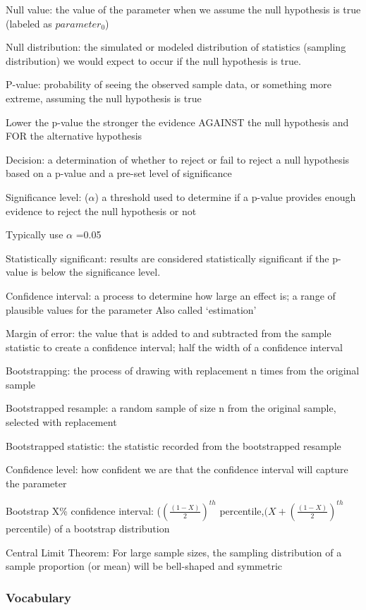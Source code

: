 \documentclass[
]{report}
\newcommand{\rgi}{\hspace{24pt}}  %
\begin{document}
Null value: the value of the parameter when we assume the null hypothesis is true (labeled as \(parameter_0\))

Null distribution: the simulated or modeled distribution of statistics (sampling distribution) we would expect to occur if the null hypothesis is true.

P-value: probability of seeing the observed sample data, or something more extreme, assuming the null hypothesis is true

\rgi Lower the p-value the stronger the evidence AGAINST the null hypothesis and FOR the alternative hypothesis

Decision: a determination of whether to reject or fail to reject a null hypothesis based on a p-value and a pre-set level of significance

Significance level: (\(\alpha\)) a threshold used to determine if a p-value provides enough evidence to reject the null hypothesis or not

\rgi Typically use \(\alpha\) =0.05

Statistically significant: results are considered statistically significant if the p-value is below the significance level.

Confidence interval: a process to determine how large an effect is; a range of plausible values for the parameter
\rgi Also called `estimation'

Margin of error: the value that is added to and subtracted from the sample statistic to create a confidence interval; half the width of a confidence interval

Bootstrapping: the process of drawing with replacement n times from the original sample

Bootstrapped resample: a random sample of size n from the original sample, selected with replacement

Bootstrapped statistic: the statistic recorded from the bootstrapped resample

Confidence level: how confident we are that the confidence interval will capture the parameter

Bootstrap X\% confidence interval: (\((\frac{(1-X)}{2})^{th}\) percentile,\((X+(\frac{(1-X)}{2})^{th}\) percentile) of a bootstrap distribution

Central Limit Theorem: For large sample sizes, the sampling distribution of a sample proportion (or mean) will be bell-shaped and symmetric

\hypertarget{vocabulary-17}{%
\subsubsection*{Vocabulary}\label{vocabulary-17}}
\end{document}
